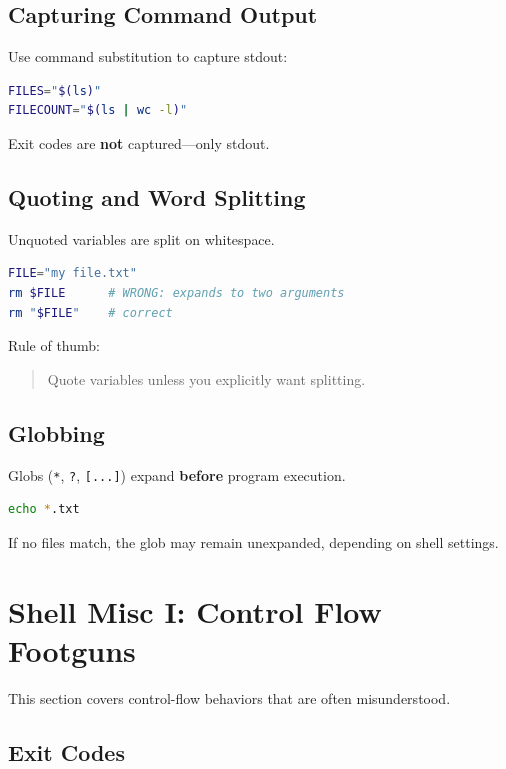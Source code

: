 \documentclass{../juni}
\begin{document}
\subsection{Capturing Command Output}

Use command substitution to capture stdout:

\begin{lstlisting}[language=bash]
FILES="$(ls)"
FILECOUNT="$(ls | wc -l)"
\end{lstlisting}

Exit codes are \textbf{not} captured—only stdout.

\subsection{Quoting and Word Splitting}

Unquoted variables are split on whitespace.

\begin{lstlisting}[language=bash]
FILE="my file.txt"
rm $FILE      # WRONG: expands to two arguments
rm "$FILE"    # correct
\end{lstlisting}

Rule of thumb:
\begin{quote}
Quote variables unless you explicitly want splitting.
\end{quote}

\subsection{Globbing}

Globs (\texttt{*}, \texttt{?}, \texttt{[...]}) expand \textbf{before} program
execution.

\begin{lstlisting}[language=bash]
echo *.txt
\end{lstlisting}

If no files match, the glob may remain unexpanded, depending on shell settings.

\newpage
\section{Shell Misc I: Control Flow Footguns}

This section covers control-flow behaviors that are often misunderstood.

\subsection{Exit Codes}
\end{document}
